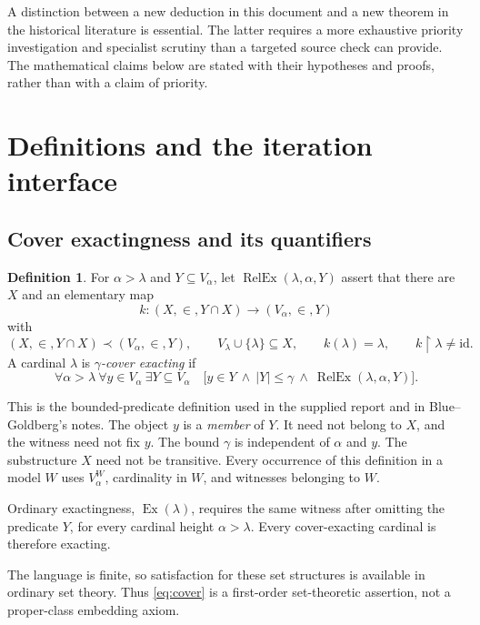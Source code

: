 \documentclass[11pt,letterpaper]{article}
\theoremstyle{definition}
\newtheorem{definition}{Definition}[section]
\newcommand{\Ex}{\operatorname{Ex}}
\newcommand{\id}{\mathrm{id}}
\newcommand{\restr}{\mathbin{\upharpoonright}}
\newcommand{\RelEx}{\operatorname{RelEx}}
\begin{document}
A distinction between a new deduction in this document and a new theorem
in the historical literature is essential. The latter requires a more
exhaustive priority investigation and specialist scrutiny than a targeted
source check can provide. The mathematical claims below are stated with
their hypotheses and proofs, rather than with a claim of priority.

\section{Definitions and the iteration interface}\label{sec:definitions}

\subsection{Cover exactingness and its quantifiers}

\begin{definition}\label{def:relative}
For $\alpha>\lambda$ and $Y\subseteq V_\alpha$, let
$\RelEx(\lambda,\alpha,Y)$ assert that there are $X$ and an elementary map
\[
 k:(X,\in,Y\cap X)\longrightarrow(V_\alpha,\in,Y)
\]
with
\[
 (X,\in,Y\cap X)\prec(V_\alpha,\in,Y),\qquad
 V_\lambda\cup\{\lambda\}\subseteq X,\qquad
 k(\lambda)=\lambda,\qquad k\restr\lambda\ne\id.
\]
A cardinal $\lambda$ is \emph{$\gamma$-cover exacting} if
\begin{equation}\label{eq:cover}
 \forall\alpha>\lambda\ \forall y\in V_\alpha\ \exists Y\subseteq V_\alpha
 \quad
 \bigl[y\in Y\ \wedge\ |Y|\leq\gamma\ \wedge\
       \RelEx(\lambda,\alpha,Y)\bigr].
\end{equation}
\end{definition}

This is the bounded-predicate definition used in the supplied report and
in Blue--Goldberg's notes.\cite[Definitions~2.6 and~3.1]{cover}
The object $y$ is a \emph{member} of $Y$. It need not belong to $X$, and
the witness need not fix $y$. The bound $\gamma$ is independent of
$\alpha$ and $y$. The substructure $X$ need not be transitive.
Every occurrence of this definition in a model $W$ uses $V_\alpha^W$,
cardinality in $W$, and witnesses belonging to $W$.

Ordinary exactingness, $\Ex(\lambda)$, requires the same witness after
omitting the predicate $Y$, for every cardinal height $\alpha>\lambda$.
Every cover-exacting cardinal is therefore exacting.

The language is finite, so satisfaction for these set structures is
available in ordinary set theory. Thus \eqref{eq:cover} is a first-order
set-theoretic assertion, not a proper-class embedding axiom.
\end{document}
